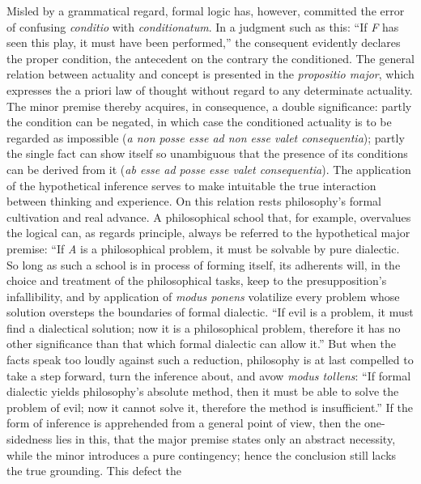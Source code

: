 \documentclass[12pt]{book}
\begin{document}
Misled by a grammatical regard, formal logic has, however, committed the
error of confusing \textit{conditio} with \textit{conditionatum}. In a
judgment such as this: ``If \textit{F} has seen this play, it must have been
performed,'' the consequent evidently declares the proper condition, the
antecedent on the contrary the conditioned. The general relation between
actuality and concept is presented in the \textit{propositio major}, which
expresses the a priori law of thought without regard to any determinate
actuality. The minor premise thereby acquires, in consequence, a double
significance: partly the condition can be negated, in which case the
conditioned actuality is to be regarded as impossible (\textit{a non posse
esse ad non esse valet consequentia}); partly the single fact can show
itself so unambiguous that the presence of its conditions can be derived
from it (\textit{ab esse ad posse esse valet consequentia}). The application
of the hypothetical inference serves to make intuitable the true interaction
between thinking and experience. On this relation rests philosophy's formal
cultivation and real advance. A philosophical school that, for example,
overvalues the logical can, as regards principle, always be referred to the
hypothetical major premise: ``If \textit{A} is a philosophical problem, it
must be solvable by pure dialectic. So long as such a school is in process
of forming itself, its adherents will, in the choice and treatment of the
philosophical tasks, keep to the presupposition's infallibility, and by
application of \textit{modus ponens} volatilize every problem whose solution
oversteps the boundaries of formal dialectic. ``If evil is a problem, it
must find a dialectical solution; now it is a philosophical problem,
therefore it has no other significance than that which formal dialectic can
allow it.'' But when the facts speak too loudly against such a reduction,
philosophy is at last compelled to take a step forward, turn the inference
about, and avow \textit{modus tollens}: ``If formal dialectic yields
philosophy's absolute method, then it must be able to solve the problem of
evil; now it cannot solve it, therefore the method is insufficient.'' If the
form of inference is apprehended from a general point of view, then the
one-sidedness lies in this, that the major premise states only an abstract
necessity, while the minor introduces a pure contingency; hence the
conclusion still lacks the true grounding. This defect the
\end{document}
